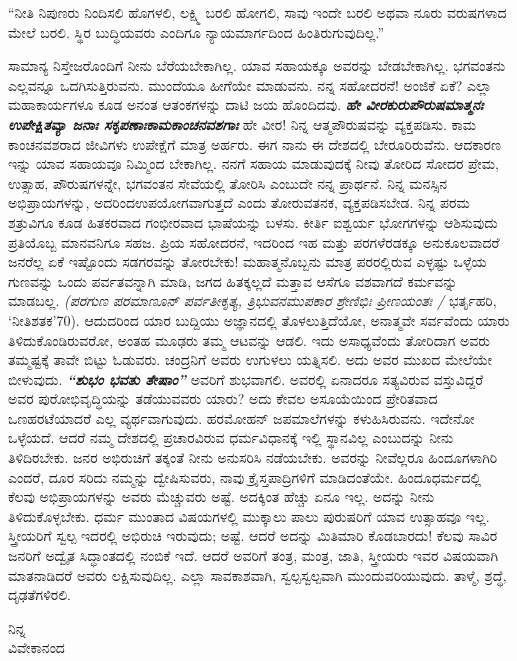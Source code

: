 ``ನೀತಿ ನಿಪುಣರು ನಿಂದಿಸಲಿ ಹೊಗಳಲಿ, ಲಕ್ಷ್ಮಿ ಬರಲಿ ಹೋಗಲಿ, ಸಾವು ಇಂದೇ ಬರಲಿ ಅಥವಾ ನೂರು ವರುಷಗಳಾದ ಮೇಲೆ ಬರಲಿ. ಸ್ಥಿರ ಬುದ್ಧಿಯವರು ಎಂದಿಗೂ ನ್ಯಾಯಮಾರ್ಗದಿಂದ ಹಿಂತಿರುಗುವುದಿಲ್ಲ.”

ಸಾಮಾನ್ಯ ನಿಸ್ತೇಜರೊಂದಿಗೆ ನೀನು ಬೆರೆಯಬೇಕಾಗಿಲ್ಲ. ಯಾವ ಸಹಾಯಕ್ಕೂ ಅವರನ್ನು ಬೇಡಬೇಕಾಗಿಲ್ಲ. ಭಗವಂತನು ಎಲ್ಲವನ್ನೂ ಒದಗಿಸುತ್ತಿರುವನು. ಮುಂದೆಯೂ ಹೀಗೆಯೇ ಮಾಡುವನು. ನನ್ನ ಸಹೋದರನೆ! ಅಂಜಿಕೆ ಏಕೆ? ಎಲ್ಲಾ ಮಹಾಕಾರ್ಯಗಳೂ ಕೂಡ ಅನಂತ ಆತಂಕಗಳನ್ನು ದಾಟಿ ಜಯ ಹೊಂದಿದವು. \textbf{\textit{ಹೇ ವೀರಕುರುಪೌರುಷಮಾತ್ಮನಃ ಉಪೇಕ್ಷಿತವ್ಯಾ ಜನಾಃ ಸಕೃಪಣಾಃಕಾಮಕಾಂಚನವಶಗಾಃ}}\enginline{-} ಹೇ ವೀರ! ನಿನ್ನ ಆತ್ಮಪೌರುಷವನ್ನು ವ್ಯಕ್ತಪಡಿಸು. ಕಾಮ ಕಾಂಚನವಶರಾದ ಜೀವಿಗಳು ಉಪೇಕ್ಷೆಗೆ ಮಾತ್ರ ಅರ್ಹರು. ಈಗ ನಾನು ಈ ದೇಶದಲ್ಲಿ ಬೇರೂರಿರುವೆನು. ಆದಕಾರಣ ಇನ್ನು ಯಾವ ಸಹಾಯವೂ ನಿಮ್ಮಿಂದ ಬೇಕಾಗಿಲ್ಲ. ನನಗೆ ಸಹಾಯ ಮಾಡುವುದಕ್ಕೆ ನೀವು ತೋರಿದ ಸೋದರ ಪ್ರೇಮ, ಉತ್ಸಾಹ, ಪೌರುಷಗಳನ್ನೇ, ಭಗವಂತನ ಸೇವೆಯಲ್ಲಿ ತೋರಿಸಿ ಎಂಬುದೇ ನನ್ನ ಪ್ರಾರ್ಥನೆ. ನಿನ್ನ ಮನಸ್ಸಿನ ಅಭಿಪ್ರಾಯಗಳನ್ನು, ಅದರಿಂದಉಪಯೋಗವಾಗುತ್ತದೆ ಎಂದು ತೋರುವತನಕ, ವ್ಯಕ್ತಪಡಿಸಬೇಡ. ನಿನ್ನ ಪರಮ ಶತ್ರುವಿಗೂ ಕೂಡ ಹಿತಕರವಾದ ಗಂಭೀರವಾದ ಭಾಷೆಯನ್ನು ಬಳಸು. ಕೀರ್ತಿ ಐಶ್ವರ್ಯ ಭೋಗಗಳನ್ನು ಆಶಿಸುವುದು ಪ್ರತಿಯೊಬ್ಬ ಮಾನವನಿಗೂ ಸಹಜ. ಪ್ರಿಯ ಸಹೋದರನೆ, ಇದರಿಂದ ಇಹ ಮತ್ತು ಪರಗಳೆರಡಕ್ಕೂ ಅನುಕೂಲವಾದರೆ ಜನರೆಲ್ಲ ಏಕೆ ಇಷ್ಟೊಂದು ಸಡಗರವನ್ನು ತೋರಬೇಕು! ಮಹಾತ್ಮನೊಬ್ಬನು ಮಾತ್ರ ಪರರಲ್ಲಿರುವ ಎಳ್ಳಷ್ಟು ಒಳ್ಳೆಯ ಗುಣವನ್ನು ಒಂದು ಪರ್ವತವನ್ನಾಗಿ ಮಾಡಿ, ಜಗದ ಹಿತಕ್ಕಲ್ಲದೆ ಮತ್ತಾವ ಆಸೆಗೂ ವಶವಾಗದೆ ಕರ್ಮವನ್ನು ಮಾಡಬಲ್ಲ. \textit{(ಪರಗುಣ ಪರಮಾಣೂನ್ ಪರ್ವತೀಕೃತ್ಯ, ತ್ರಿಭುವನಮುಪಕಾರ ಶ್ರೇಣಿಭಿಃ ಪ್ರೀಣಯಂತಃ /}\enginline{-} ಭರ್ತೃಹರಿ, `ನೀತಿಶತಕ'\enginline{-}70). ಆದುದರಿಂದ ಯಾರ ಬುದ್ದಿಯು ಅಜ್ಞಾನದಲ್ಲಿ ತೊಳಲುತ್ತಿದೆಯೋ, ಅನಾತ್ಮವೇ ಸರ್ವವೆಂದು ಯಾರು ತಿಳಿದುಕೊಂಡಿರುವರೋ, ಅಂತಹ ಮೂಢರು ತಮ್ಮ ಆಟವನ್ನು ಆಡಲಿ. ಇದು ಅಸಾಧ್ಯವೆಂದು ತೋರಿದಾಗ ಅವರು ತಮ್ಮಷ್ಟಕ್ಕೆ ತಾವೇ ಬಿಟ್ಟು ಓಡುವರು. ಚಂದ್ರನಿಗೆ ಅವರು ಉಗುಳಲು ಯತ್ನಿಸಲಿ. ಅದು ಅವರ ಮುಖದ ಮೇಲೆಯೇ ಬೀಳುವುದು. \textbf{\textit{ “ಶುಭಂ ಭವತು ತೇಷಾಂ” }} ಅವರಿಗೆ ಶುಭವಾಗಲಿ. ಅವರಲ್ಲಿ ಏನಾದರೂ ಸತ್ಯವಿರುವ ವಸ್ತುವಿದ್ದರೆ ಅವರ ಪುರೋಭಿವೃದ್ಧಿಯನ್ನು ತಡೆಯುವವರು ಯಾರು? ಅದು ಕೇವಲ ಅಸೂಯೆಯಿಂದ ಪ್ರೇರಿತವಾದ ಒಣಹರಟೆಯಾದರೆ ಎಲ್ಲ ವ್ಯರ್ಥವಾಗುವುದು. ಹರಮೋಹನ್ ಜಪಮಾಲೆಗಳನ್ನು ಕಳುಹಿಸಿರುವನು. ಇದೇನೋ ಒಳ್ಳೆಯದೆ. ಆದರೆ ನಮ್ಮ ದೇಶದಲ್ಲಿ ಪ್ರಚಾರವಿರುವ ಧರ್ಮವಿಧಾನಕ್ಕೆ ಇಲ್ಲಿ ಸ್ಥಾನವಿಲ್ಲ ಎಂಬುದನ್ನು ನೀನು ತಿಳಿದಿರಬೇಕು. ಜನರ ಅಭಿರುಚಿಗೆ ತಕ್ಕಂತೆ ನೀನು ಅನುಸರಿಸಿ ನಡೆಯಬೇಕು. ಅವರನ್ನು ನೀವೆಲ್ಲರೂ ಹಿಂದೂಗಳಾಗಿರಿ ಎಂದರೆ, ದೂರ ಸರಿದು ನಮ್ಮನ್ನು ದ್ವೇಷಿಸುವರು, ನಾವು ಕ್ರೈಸ್ತಪಾದ್ರಿಗಳಿಗೆ ಮಾಡಿದಂತೆಯೇ. ಹಿಂದೂಧರ್ಮದಲ್ಲಿ ಕೆಲವು ಅಭಿಪ್ರಾಯಗಳನ್ನು ಅವರು ಮೆಚ್ಚುವರು ಅಷ್ಟೆ. ಅದಕ್ಕಿಂತ ಹೆಚ್ಚು ಏನೂ ಇಲ್ಲ. ಅದನ್ನು ನೀನು ತಿಳಿದುಕೊಳ್ಳಬೇಕು. ಧರ್ಮ ಮುಂತಾದ ವಿಷಯಗಳಲ್ಲಿ ಮುಕ್ಕಾಲು ಪಾಲು ಪುರುಷರಿಗೆ ಯಾವ ಉತ್ಸಾಹವೂ ಇಲ್ಲ. ಸ್ತ್ರೀಯರಿಗೆ ಸ್ವಲ್ಪ ಇದರಲ್ಲಿ ಅಭಿರುಚಿ ಇರುವುದು; ಅಷ್ಟೆ. ಆದರೆ ಅದನ್ನು ಮಿತಿಮಾರಿ ಕೊಡಬಾರದು! ಕೆಲವು ಸಾವಿರ ಜನರಿಗೆ ಅದ್ವೈತ ಸಿದ್ಧಾಂತದಲ್ಲಿ ನಂಬಿಕೆ ಇದೆ. ಆದರೆ ಅವರಿಗೆ ತಂತ್ರ, ಮಂತ್ರ, ಜಾತಿ, ಸ್ತ್ರೀಯರು ಇವರ ವಿಷಯವಾಗಿ ಮಾತನಾಡಿದರೆ ಅವರು ಲಕ್ಷಿಸುವುದಿಲ್ಲ. ಎಲ್ಲಾ ಸಾವಕಾಶವಾಗಿ, ಸ್ವಲ್ಪಸ್ವಲ್ಪವಾಗಿ ಮುಂದುವರಿಯುವುದು. ತಾಳ್ಮೆ, ಶ್ರದ್ಧೆ, ದೃಢತೆಗಳಿರಲಿ.

{\flushright
ನಿನ್ನ\\ವಿವೇಕಾನಂದ\par}

